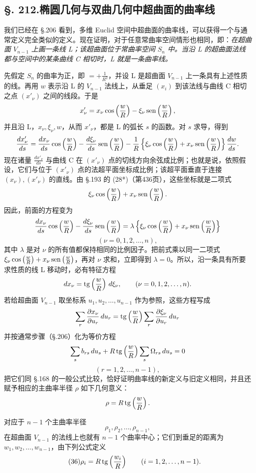 \subsection*{\S. 212.\quad 椭圆几何与双曲几何中超曲面的曲率线}

我们已经在 \S.206 看到，多维 Euclid 空间中超曲面的曲率线，可以获得一个与通常定义完全类似的定义。现在证明，对于任意常曲率空间情形也相同，即：\emph{在超曲面 $V_{n-1}$ 上画一条线 L；该超曲面位于常曲率空间 $S_n$ 中。当沿 L 的超曲面法线都与空间中的某条曲线 C 相切时，L 就是一条曲率线。}

先假定 $S_n$ 的曲率为正，即 $=+\frac1{R^2}$，并设 L 是超曲面 $V_{n-1}$ 上一条具有上述性质的线。再用 $w$ 表示沿 L 的 $V_{n-1}$ 法线上，从垂足 $(x_i)$ 到该法线与曲线 C 相切之点 $(x'_\nu)$ 之间的线段。于是
\[
x'_\nu=x_\nu\cos\left(\frac wR\right)-\xi_\nu\operatorname{sen}\left(\frac wR\right),
\]
并且沿 L，$x_\nu,\xi_\nu,w$，从而 $x'_\nu$，都是 L 的弧长 $s$ 的函数。对 $s$ 求导，得到
\[
\frac{dx'_\nu}{ds}
=\frac{dx_\nu}{ds}\cos\left(\frac wR\right)
-\frac{d\xi_\nu}{ds}\operatorname{sen}\left(\frac wR\right)
-\frac1R\left\{\xi_\nu\cos\left(\frac wR\right)+x_\nu\operatorname{sen}\left(\frac wR\right)\right\}\frac{dw}{ds}.
\]
现在诸量 $\frac{dx'_\nu}{ds}$ 与曲线 C 在 $(x'_\nu)$ 点的切线方向余弦成比例；也就是说，依照假设，它们与位于 $(x'_\nu)$ 点的法超平面坐标成比例；该超平面垂直于连接 $(x_\nu),(x'_\nu)$ 的直线。由 \S.193 的 (28*)（第436页），这些坐标就是二项式
\[
\xi_\nu\cos\left(\frac wR\right)+x_\nu\operatorname{sen}\left(\frac wR\right).
\]
因此，前面的方程变为
\[
\frac{dx_\nu}{ds}\cos\left(\frac wR\right)
-\frac{d\xi_\nu}{ds}\operatorname{sen}\left(\frac wR\right)
=\lambda\left\{\xi_\nu\cos\left(\frac wR\right)+x_\nu\operatorname{sen}\left(\frac wR\right)\right\}
\]
\[
(\nu=0,1,2,\ldots,n),
\]
其中 $\lambda$ 是对 $\nu$ 的所有值都保持相同的比例因子。把前式乘以同一二项式 $\xi_\nu\cos\left(\frac wR\right)+x_\nu\operatorname{sen}\left(\frac wR\right)$，再对 $\nu$ 求和，立即得到 $\lambda=0$。所以，沿一条具有所要求性质的线 L 移动时，必有特征方程
\[
dx_\nu=\operatorname{tg}\left(\frac wR\right)\,d\xi_\nu,\qquad(\nu=0,1,2,\ldots,n).
\]
若给超曲面 $V_{n-1}$ 取坐标系 $u_1,u_2,\ldots,u_{n-1}$ 作为参照，这些方程写成
\[
\sum_r\frac{\partial x_\nu}{\partial u_r}\,du_r
=\operatorname{tg}\left(\frac wR\right)\sum_r\frac{\partial \xi_\nu}{\partial u_r}\,du_r
\]
并按通常步骤（\S.206）化为等价方程
\[
\sum_s b_{rs}\,du_s+R\operatorname{tg}\left(\frac wR\right)\sum_s\Omega_{rs}\,du_s=0
\]
\[
(r=1,2,\ldots,n-1),
\]
把它们同 \S.168 的一般公式比较，恰好证明曲率线的新定义与旧定义相同，并且还赋予相应的主曲率半径 $\rho$ 如下几何意义：
\[
\rho=R\operatorname{tg}\left(\frac wR\right).
\]

对应于 $n-1$ 个主曲率半径
\[
\rho_1,\rho_2,\ldots,\rho_{n-1},
\]
在超曲面 $V_{n-1}$ 的法线上也就有 $n-1$ 个曲率中心；它们到垂足的距离为 $w_1,w_2,\ldots,w_{n-1}$，由下列公式定义
\[
\tag{36}
\rho_i=R\operatorname{tg}\left(\frac{w_i}{R}\right)\qquad (i=1,2,\ldots,n-1).
\]

